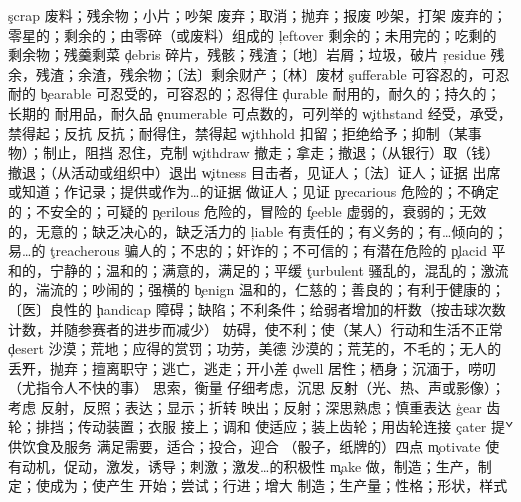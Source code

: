 \begin{multicols}{2}
\c{scrap}  \n 废料；残余物；小片；吵架 \vt 废弃；取消；抛弃；报废 \vi 吵架，打架 \a 废弃的；零星的；剩余的；由零碎（或废料）组成的
\c{leftover}  \a 剩余的；未用完的；吃剩的 \n 剩余物；残羹剩菜
\c{debris}  \n 碎片，残骸；残渣；〔地〕岩屑；垃圾，破片
\c{residue}  \n 残余，残渣；余渣，残余物；〔法〕剩余财产；〔林〕废材
\c{sufferable}  \a 可容忍的，可忍耐的
\c{bearable}  \a 可忍受的，可容忍的；忍得住
\c{durable}  \a 耐用的，耐久的；持久的；长期的 \n 耐用品，耐久品
\c{enumerable}  \a 可点数的，可列举的
\c{withstand}  \vt 经受，承受，禁得起；反抗 \vi 反抗；耐得住，禁得起
\c{withhold}  \vt 扣留；拒绝给予；抑制（某事物）；制止，阻挡 \vi 忍住，克制
\c{withdraw}  \vt 撤走；拿走；撤退；（从银行）取（钱） \vi 撤退；（从活动或组织中）退出
\c{witness}  \n 目击者，见证人；〔法〕证人；证据 \vt 出席或知道；作记录；提供或作为…的证据 \vi 做证人；见证
\c{precarious}  \a 危险的；不确定的；不安全的；可疑的
\c{perilous}  \a 危险的，冒险的
\c{feeble}  \a 虚弱的，衰弱的；无效的，无意的；缺乏决心的，缺乏活力的
\c{liable}  \a 有责任的；有义务的；有…倾向的；易…的
\c{treacherous}  \a 骗人的；不忠的；奸诈的；不可信的；有潜在危险的
\c{placid}  \a 平和的，宁静的；温和的；满意的，满足的；平缓
\c{turbulent}  \a 骚乱的，混乱的；激流的，湍流的；吵闹的；强横的
\c{benign}  \a 温和的，仁慈的；善良的；有利于健康的；〔医〕良性的
\c{handicap}  \n 障碍；缺陷；不利条件；给弱者增加的杆数（按击球次数计数，并随参赛者的进步而减少） \vt 妨碍，使不利；使（某人）行动和生活不正常
\c{desert}  \n 沙漠；荒地；应得的赏罚；功劳，美德 \a 沙漠的；荒芜的，不毛的；无人的 \v 丢开，抛弃；擅离职守；逃亡，逃走；开小差
\c{dwell}  \v 居住；栖身；沉湎于，唠叨（尤指令人不快的事） 
  \vt 思索，衡量 \vi 仔细考虑，沉思
  \v 反射（光、热、声或影像）；考虑 \vt 反射，反照；表达；显示；折转 \vi 映出；反射；深思熟虑；慎重表达 
\c{gear}  \n 齿轮；排挡；传动装置；衣服 \vi 接上；调和 \vt 使适应；装上齿轮；用齿轮连接 
\c{cater}  \v 提供饮食及服务 \vt 满足需要，适合；投合，迎合 \n （骰子，纸牌的）四点 
\c{motivate}  \vt 使有动机，促动，激发，诱导；刺激；激发…的积极性
\c{make}  \vt 做，制造；生产，制定；使成为；使产生 \vi 开始；尝试；行进；增大 \n 制造；生产量；性格；形状，样式 

\end{multicols}
